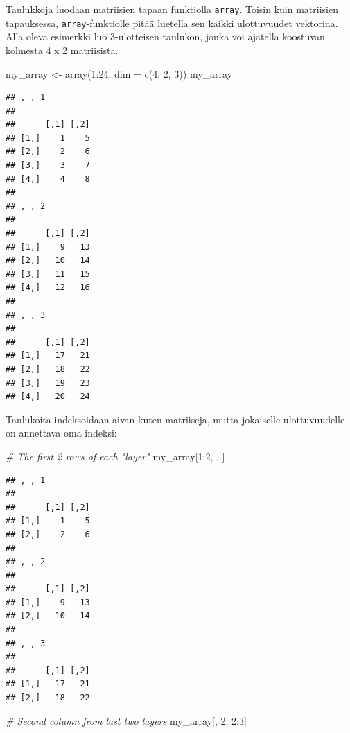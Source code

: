 \documentclass[
]{book}
\newenvironment{Shaded}{\begin{snugshade}}{\end{snugshade}}
\newcommand{\AttributeTok}[1]{\textcolor[rgb]{0.77,0.63,0.00}{#1}}
\newcommand{\CommentTok}[1]{\textcolor[rgb]{0.56,0.35,0.01}{\textit{#1}}}
\newcommand{\DecValTok}[1]{\textcolor[rgb]{0.00,0.00,0.81}{#1}}
\newcommand{\FunctionTok}[1]{\textcolor[rgb]{0.00,0.00,0.00}{#1}}
\newcommand{\NormalTok}[1]{#1}
\newcommand{\OtherTok}[1]{\textcolor[rgb]{0.56,0.35,0.01}{#1}}
\newcommand{\SpecialCharTok}[1]{\textcolor[rgb]{0.00,0.00,0.00}{#1}}
\begin{document}
Taulukkoja luodaan matriisien tapaan funktiolla \texttt{array}. Toisin kuin matriisien tapauksessa, \texttt{array}-funktiolle pitää luetella sen kaikki ulottuvuudet vektorina. Alla oleva esimerkki luo 3-ulotteisen taulukon, jonka voi ajatella koostuvan kolmesta 4 x 2 matriisista.

\begin{Shaded}
\begin{Highlighting}[]
\NormalTok{my\_array }\OtherTok{\textless{}{-}} \FunctionTok{array}\NormalTok{(}\DecValTok{1}\SpecialCharTok{:}\DecValTok{24}\NormalTok{, }\AttributeTok{dim =} \FunctionTok{c}\NormalTok{(}\DecValTok{4}\NormalTok{, }\DecValTok{2}\NormalTok{, }\DecValTok{3}\NormalTok{))}
\NormalTok{my\_array}
\end{Highlighting}
\end{Shaded}

\begin{verbatim}
## , , 1
## 
##      [,1] [,2]
## [1,]    1    5
## [2,]    2    6
## [3,]    3    7
## [4,]    4    8
## 
## , , 2
## 
##      [,1] [,2]
## [1,]    9   13
## [2,]   10   14
## [3,]   11   15
## [4,]   12   16
## 
## , , 3
## 
##      [,1] [,2]
## [1,]   17   21
## [2,]   18   22
## [3,]   19   23
## [4,]   20   24
\end{verbatim}

Taulukoita indeksoidaan aivan kuten matriiseja, mutta jokaiselle ulottuvuudelle on annettava oma indeksi:

\begin{Shaded}
\begin{Highlighting}[]
\CommentTok{\# The first 2 rows of each "layer"}
\NormalTok{my\_array[}\DecValTok{1}\SpecialCharTok{:}\DecValTok{2}\NormalTok{, , ]}
\end{Highlighting}
\end{Shaded}

\begin{verbatim}
## , , 1
## 
##      [,1] [,2]
## [1,]    1    5
## [2,]    2    6
## 
## , , 2
## 
##      [,1] [,2]
## [1,]    9   13
## [2,]   10   14
## 
## , , 3
## 
##      [,1] [,2]
## [1,]   17   21
## [2,]   18   22
\end{verbatim}

\begin{Shaded}
\begin{Highlighting}[]
\CommentTok{\# Second column from last two layers}
\NormalTok{my\_array[, }\DecValTok{2}\NormalTok{, }\DecValTok{2}\SpecialCharTok{:}\DecValTok{3}\NormalTok{]}
\end{Highlighting}
\end{Shaded}
\end{document}
